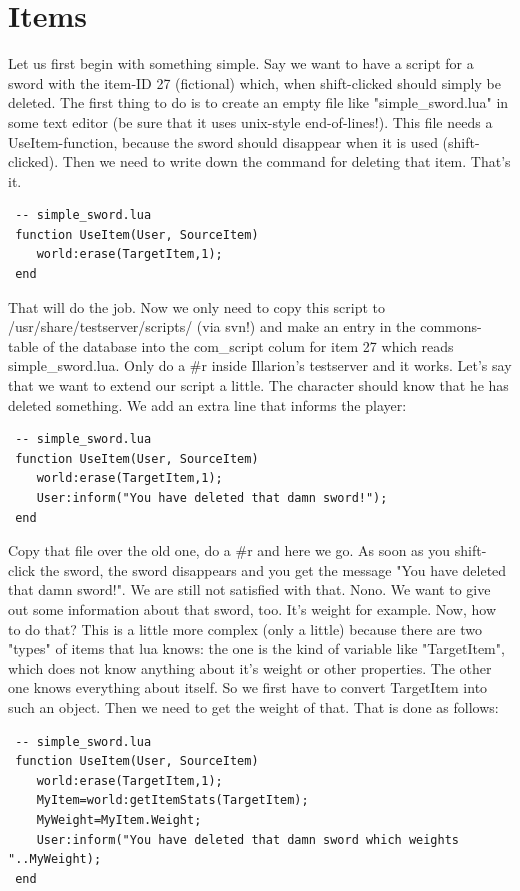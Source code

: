 \documentclass[a4paper,10pt,makeidx]{scrreprt}
\begin{document}
\section{Items}
Let us first begin with something simple. Say we want to have a script for a sword with the item-ID 27 (fictional) which, when shift-clicked should simply be deleted. The first thing to do is to create an empty file like "simple\_sword.lua" in some text editor (be sure that it uses unix-style end-of-lines!).
This file needs a UseItem-function, because the sword should disappear when it is used (shift-clicked). Then we need to write down the command for deleting that item. That's it.
\begin{verbatim}
 -- simple_sword.lua
 function UseItem(User, SourceItem)
    world:erase(TargetItem,1);
 end
\end{verbatim}
That will do the job. Now we only need to copy this script to /usr/share/testserver/scripts/ (via svn!) and make an entry in the commons-table of the database into the com\_script colum for item 27 which reads simple\_sword.lua. Only do a \#r inside Illarion's testserver and it works.
Let's say that we want to extend our script a little. The character should know that he has deleted something. We add an extra line that informs the player:
\begin{verbatim}
 -- simple_sword.lua
 function UseItem(User, SourceItem)
    world:erase(TargetItem,1);
    User:inform("You have deleted that damn sword!");
 end
 \end{verbatim}
Copy that file over the old one, do a \#r and here we go. As soon as you shift-click the sword, the sword disappears and you get the message "You have deleted that damn sword!".
We are still not satisfied with that. Nono. We want to give out some information about that sword, too. It's weight for example. Now, how to do that? This is a little more complex (only a little) because there are two "types" of items that lua knows: the one is the kind of variable like "TargetItem", which does not know anything about it's weight or other properties. The other one knows everything about itself. So we first have to convert TargetItem into such an object. Then we need to get the weight of that. That is done as follows:
\begin{verbatim}
 -- simple_sword.lua
 function UseItem(User, SourceItem)
    world:erase(TargetItem,1);
    MyItem=world:getItemStats(TargetItem);
    MyWeight=MyItem.Weight;
    User:inform("You have deleted that damn sword which weights "..MyWeight);
 end
 \end{verbatim}
\end{document}
